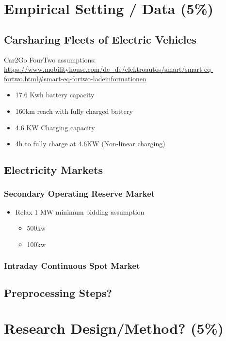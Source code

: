 \documentclass[12pt, article]{article}
\begin{document}
\section{Empirical Setting / Data (5\%)}
\label{sec:orgad55f8d}
\subsection{Carsharing Fleets of Electric Vehicles}
\label{sec:org5dadf87}
Car2Go FourTwo assumptions:
\url{https://www.mobilityhouse.com/de\_de/elektroautos/smart/smart-eq-fortwo.html\#smart-eq-fortwo-ladeinformationen}

\begin{itemize}
\item 17.6 Kwh battery capacity
\item 160km reach with fully charged battery

\item 4.6 KW Charging capacity
\item 4h to fully charge at 4.6KW (Non-linear charging)
\end{itemize}
\subsection{Electricity Markets}
\label{sec:org8f8aec8}
\subsubsection{Secondary Operating Reserve Market}
\label{sec:org10f5e3e}
\begin{itemize}
\item Relax 1 MW minimum bidding assumption
\begin{itemize}
\item 500kw
\item 100kw
\end{itemize}
\end{itemize}
\subsubsection{Intraday Continuous Spot Market}
\label{sec:orga256575}
\subsection{Preprocessing Steps?}
\label{sec:org6a0d853}

\section{Research Design/Method? (5\%)}
\label{sec:orgad19ad5}
\end{document}
